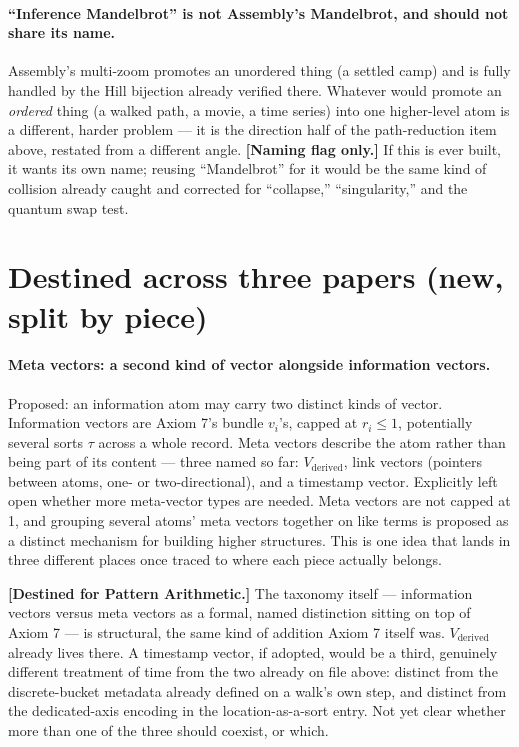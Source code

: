 \documentclass[11pt]{article}
\begin{document}
\paragraph{``Inference Mandelbrot'' is not Assembly's Mandelbrot, and
should not share its name.} Assembly's multi-zoom promotes an
unordered thing (a settled camp) and is fully handled by the Hill
bijection already verified there. Whatever would promote an
\emph{ordered} thing (a walked path, a movie, a time series) into one
higher-level atom is a different, harder problem --- it is the
direction half of the path-reduction item above, restated from a
different angle. \textbf{[Naming flag only.]} If this is ever built,
it wants its own name; reusing ``Mandelbrot'' for it would be the same
kind of collision already caught and corrected for ``collapse,''
``singularity,'' and the quantum swap test.

\section{Destined across three papers (new, split by piece)}

\paragraph{Meta vectors: a second kind of vector alongside information
vectors.} Proposed: an information atom may carry two distinct kinds
of vector. Information vectors are Axiom 7's bundle $v_i$'s, capped at
$r_i\le1$, potentially several sorts $\tau$ across a whole record.
Meta vectors describe the atom rather than being part of its content
--- three named so far: $V_{\text{derived}}$, link vectors (pointers
between atoms, one- or two-directional), and a timestamp vector.
Explicitly left open whether more meta-vector types are needed. Meta
vectors are not capped at 1, and grouping several atoms' meta vectors
together on like terms is proposed as a distinct mechanism for
building higher structures. This is one idea that lands in three
different places once traced to where each piece actually belongs.

\textbf{[Destined for Pattern Arithmetic.]} The taxonomy itself ---
information vectors versus meta vectors as a formal, named distinction
sitting on top of Axiom 7 --- is structural, the same kind of addition
Axiom 7 itself was. $V_{\text{derived}}$ already lives there. A
timestamp vector, if adopted, would be a third, genuinely different
treatment of time from the two already on file above: distinct from
the discrete-bucket metadata already defined on a walk's own step, and
distinct from the dedicated-axis encoding in the location-as-a-sort
entry. Not yet clear whether more than one of the three should
coexist, or which.
\end{document}
